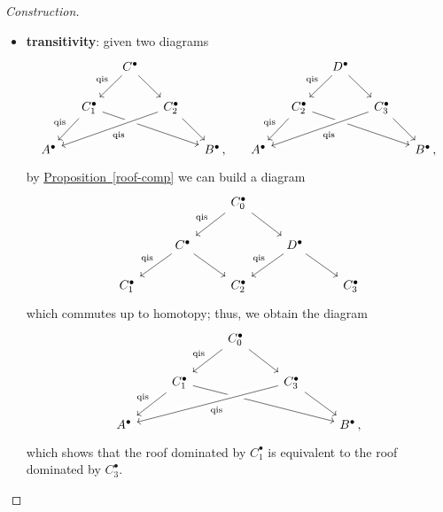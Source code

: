 \begin{thmdef}
\begin{proof}[Construction]
\begin{itemize}
            \item \textbf{transitivity}: given two diagrams
            \begin{equation*}
            \begin{tikzcd}[column sep=small]
                & & C^{\bullet} \arrow[ld, "\textrm{qis}"'] \arrow[rd] 
                & & &
                & & D^{\bullet} \arrow[ld, "\textrm{qis}"'] \arrow[rd] 
                & &\\
                & C_1^{\bullet} \arrow[ld, "\textrm{qis}"'] \arrow[rrrd] 
                & & C_2^{\bullet} \arrow[llld, "\textrm{qis}", crossing over] \arrow[rd] 
                & &
                & C_2^{\bullet} \arrow[ld, "\textrm{qis}"'] \arrow[rrrd] 
                & & C_3^{\bullet} \arrow[llld, "\textrm{qis}", crossing over] \arrow[rd] 
                &\\
                A^{\bullet} 
                &  &  &  & B^{\bullet} \,, &
                A^{\bullet} 
                &  &  &  & B^{\bullet}\,,
            \end{tikzcd}
            \end{equation*}
            by \hyperref[roof-comp]{Proposition~\ref*{roof-comp}}
            we can build a diagram
            \begin{equation*}
            \begin{tikzcd}
                && C_{0}^{\bullet} \ar[dl, "\textrm{qis}"'] \ar[dr] && \\
                & C^{\bullet} \ar[dl, "\textrm{qis}"'] \ar[dr]
                && D^{\bullet} \ar[dl, "\textrm{qis}"'] \ar[dr] & \\
                C_{1}^{\bullet} & & C_{2}^{\bullet} & & C_{3}^{\bullet}
            \end{tikzcd}
            \end{equation*}
            which commutes up to homotopy; thus, we obtain the diagram
            \begin{equation*}
            \begin{tikzcd}
                & & C_{0}^{\bullet} \arrow[ld, "\textrm{qis}"'] \arrow[rd]  
                & & \\
                & C_1^{\bullet} \arrow[ld, "\textrm{qis}"'] \arrow[rrrd] 
                & & C_3^{\bullet} \arrow[llld, "\textrm{qis}", crossing over] \arrow[rd] 
                & \\
                A^{\bullet} 
                &  &  &  & B^{\bullet}\,,
            \end{tikzcd}
            \end{equation*}
            which shows that the roof dominated by $C_{1}^{\bullet}$
            is equivalent to the roof dominated by $C^{\bullet}_{3}$.
        \end{itemize}


\end{proof}
\end{thmdef}
